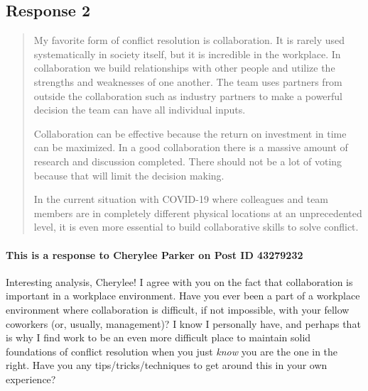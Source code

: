 
\subsection{Response 2}
  \begin{quotation}
    My favorite form of conflict resolution is collaboration. It is rarely used
      systematically in society itself, but it is incredible in the workplace.
      In collaboration we build relationships with other people and utilize
      the strengths and weaknesses of one another. The team uses partners from
      outside the collaboration such as industry partners to make a powerful
      decision the team can have all individual inputs.

    Collaboration can be effective because the return on investment in time can
      be maximized. In a good collaboration there is a massive amount of
      research and discussion completed. There should not be a lot of voting
      because that will limit the decision making.

    In the current situation with COVID-19 where colleagues and team members
      are in completely different physical locations at an unprecedented level,
      it is even more essential to build collaborative skills to solve conflict.
  \end{quotation}

  \paragraph{This is a response to Cherylee Parker on Post ID 43279232}
    Interesting analysis, Cherylee! I agree with you on the fact that
      collaboration is important in a workplace environment. Have you ever been
      a part of a workplace environment where collaboration is difficult, if
      not impossible, with your fellow coworkers (or, usually, management)?
      I know I personally have, and perhaps that is why I find work to be an
      even more difficult place to maintain solid foundations of conflict
      resolution when you just \textit{know} you are the one in the right. Have
      you any tips/tricks/techniques to get around this in your own experience?
